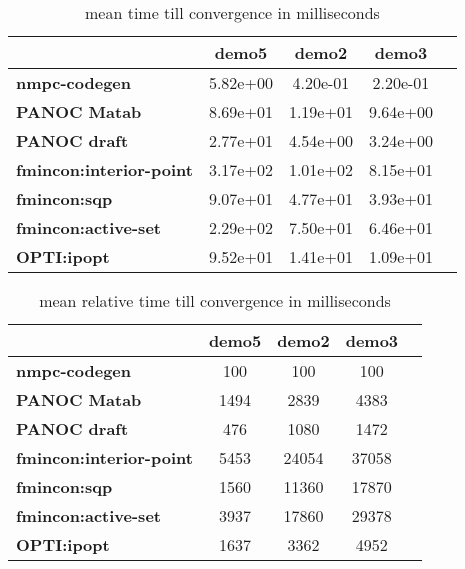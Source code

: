 \begin{table}[H]
	\centering
	\begin{tabular}{|l|c|c|c|c|}
		\hline
		&\textbf{demo5}&\textbf{demo2}&\textbf{demo3}\\\hline
		\textbf{nmpc-codegen}&5.82e+00&4.20e-01&2.20e-01\\\hline
		\textbf{PANOC Matab}&8.69e+01&1.19e+01&9.64e+00\\\hline
		\textbf{PANOC draft}&2.77e+01&4.54e+00&3.24e+00\\\hline
		\textbf{fmincon:interior-point}&3.17e+02&1.01e+02&8.15e+01\\\hline
		\textbf{fmincon:sqp}&9.07e+01&4.77e+01&3.93e+01\\\hline
		\textbf{fmincon:active-set}&2.29e+02&7.50e+01&6.46e+01\\\hline
		\textbf{OPTI:ipopt}&9.52e+01&1.41e+01&1.09e+01\\\hline
	\end{tabular}
	\caption{mean time till convergence in milliseconds}
	\label{tbl:mean time till convergence with noise}
\end{table}

\begin{table}[H]
	\centering
	\begin{tabular}{|l|c|c|c|c|}
		\hline
		&\textbf{demo5}&\textbf{demo2}&\textbf{demo3}\\\hline
		\textbf{nmpc-codegen}&100&100&100\\\hline
		\textbf{PANOC Matab}&1494&2839&4383\\\hline
		\textbf{PANOC draft}&476&1080&1472\\\hline
		\textbf{fmincon:interior-point}&5453&24054&37058\\\hline
		\textbf{fmincon:sqp}&1560&11360&17870\\\hline
		\textbf{fmincon:active-set}&3937&17860&29378\\\hline
		\textbf{OPTI:ipopt}&1637&3362&4952\\\hline
	\end{tabular}
	\caption{mean relative time till convergence in milliseconds}
	\label{tbl:mean relative time till convergence with noise}
\end{table}

